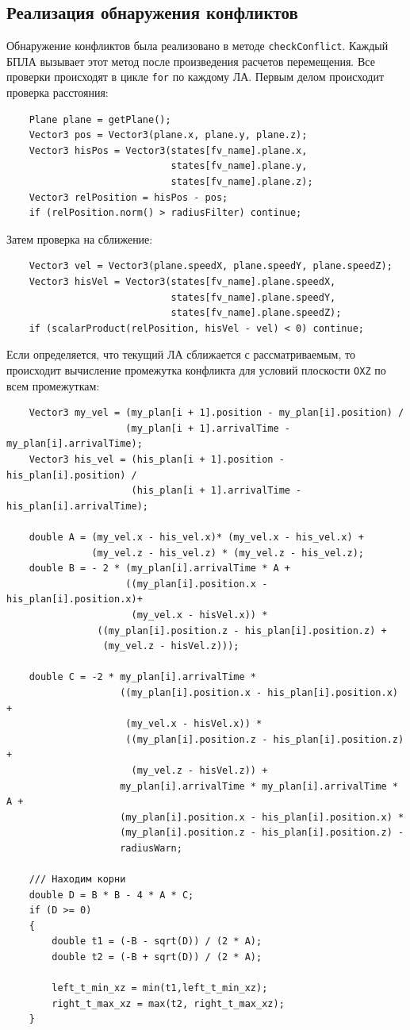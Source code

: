 \documentclass[a4paper,12pt]{article}
\numberwithin{figure}{subsubsection}
\begin{document}
\subsection{Реализация обнаружения конфликтов}
Обнаружение конфликтов была реализовано в методе \texttt{checkConflict}. Каждый БПЛА вызывает этот метод после произведения расчетов перемещения. Все проверки происходят в цикле \texttt{for} по каждому ЛА.
Первым делом происходит проверка расстояния:
\begin{verbatim}
    Plane plane = getPlane();
    Vector3 pos = Vector3(plane.x, plane.y, plane.z);
    Vector3 hisPos = Vector3(states[fv_name].plane.x, 
                             states[fv_name].plane.y, 
                             states[fv_name].plane.z);
    Vector3 relPosition = hisPos - pos;
    if (relPosition.norm() > radiusFilter) continue;
\end{verbatim}
Затем проверка на сближение:
\begin{verbatim}
    Vector3 vel = Vector3(plane.speedX, plane.speedY, plane.speedZ);
    Vector3 hisVel = Vector3(states[fv_name].plane.speedX, 
                             states[fv_name].plane.speedY, 
                             states[fv_name].plane.speedZ);
    if (scalarProduct(relPosition, hisVel - vel) < 0) continue;
\end{verbatim}
Если определяется, что текущий ЛА сближается с рассматриваемым, то происходит вычисление промежутка конфликта  для условий плоскости \texttt{OXZ} по всем промежуткам:
\begin{verbatim}
    Vector3 my_vel = (my_plan[i + 1].position - my_plan[i].position) /
                     (my_plan[i + 1].arrivalTime - my_plan[i].arrivalTime);
    Vector3 his_vel = (his_plan[i + 1].position - his_plan[i].position) /
                      (his_plan[i + 1].arrivalTime - his_plan[i].arrivalTime);
    
    double A = (my_vel.x - his_vel.x)* (my_vel.x - his_vel.x) +
               (my_vel.z - his_vel.z) * (my_vel.z - his_vel.z);
    double B = - 2 * (my_plan[i].arrivalTime * A + 
                     ((my_plan[i].position.x - his_plan[i].position.x)+ 
                      (my_vel.x - hisVel.x)) *
                ((my_plan[i].position.z - his_plan[i].position.z) +
                 (my_vel.z - hisVel.z)));
    
    double C = -2 * my_plan[i].arrivalTime * 
                    ((my_plan[i].position.x - his_plan[i].position.x) + 
                     (my_vel.x - hisVel.x)) * 
                     ((my_plan[i].position.z - his_plan[i].position.z) + 
                      (my_vel.z - hisVel.z)) + 
                    my_plan[i].arrivalTime * my_plan[i].arrivalTime * A +
                    (my_plan[i].position.x - his_plan[i].position.x) *
                    (my_plan[i].position.z - his_plan[i].position.z) - 
                    radiusWarn;
    
    /// Находим корни
    double D = B * B - 4 * A * C;
    if (D >= 0) 
    {
        double t1 = (-B - sqrt(D)) / (2 * A);
        double t2 = (-B + sqrt(D)) / (2 * A);
        
        left_t_min_xz = min(t1,left_t_min_xz);
        right_t_max_xz = max(t2, right_t_max_xz);
    }
\end{verbatim}
\end{document}
